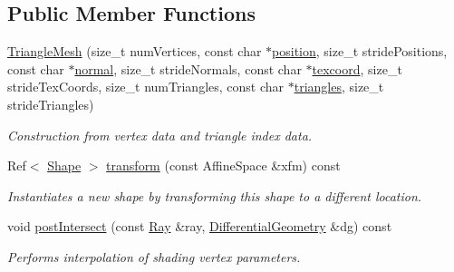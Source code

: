 \subsection*{Public Member Functions}
\begin{DoxyCompactItemize}
\item 
\hyperlink{classembree_1_1_triangle_mesh_a6a4745eb26447862a8b2b91c993d7221}{TriangleMesh} (size\_\-t numVertices, const char $\ast$\hyperlink{classembree_1_1_triangle_mesh_a8a02076acbbf919564dd43a729924fa2}{position}, size\_\-t stridePositions, const char $\ast$\hyperlink{classembree_1_1_triangle_mesh_af313e5aa4a8898c5cf34c3383ad0f1a2}{normal}, size\_\-t strideNormals, const char $\ast$\hyperlink{classembree_1_1_triangle_mesh_a3d26d3b80193bfb3382ac34c217f1b2d}{texcoord}, size\_\-t strideTexCoords, size\_\-t numTriangles, const char $\ast$\hyperlink{classembree_1_1_triangle_mesh_a0687f3b2a9800ef845be1770c94f76f8}{triangles}, size\_\-t strideTriangles)
\begin{DoxyCompactList}\small\item\em Construction from vertex data and triangle index data. \item\end{DoxyCompactList}\item 
Ref$<$ \hyperlink{classembree_1_1_shape}{Shape} $>$ \hyperlink{classembree_1_1_triangle_mesh_a1cb8ab9a95adfba8b8866fd6995df06f}{transform} (const AffineSpace \&xfm) const 
\begin{DoxyCompactList}\small\item\em Instantiates a new shape by transforming this shape to a different location. \item\end{DoxyCompactList}\item 
void \hyperlink{classembree_1_1_triangle_mesh_a3980899de9e3a599ac9bcd0e12306046}{postIntersect} (const \hyperlink{structembree_1_1_ray}{Ray} \&ray, \hyperlink{structembree_1_1_differential_geometry}{DifferentialGeometry} \&dg) const 
\begin{DoxyCompactList}\small\item\em Performs interpolation of shading vertex parameters. \item\end{DoxyCompactList}\end{DoxyCompactItemize}
